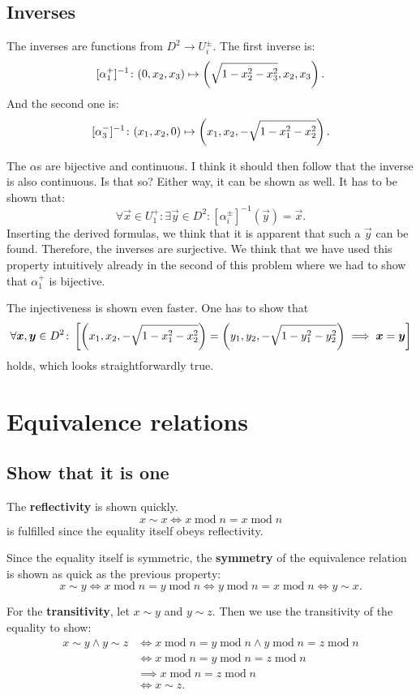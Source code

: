 \documentclass[11pt, english, fleqn, DIV=15, headinclude, BCOR=1cm]{scrartcl}
\begin{document}
\subsection{Inverses}

The inverses are functions from $D^2 \to U_i^\pm$. The first inverse is:
\[
    [\alpha_1^+]^{-1} \colon
    (0, x_2, x_3) \mapsto \left( \sqrt{1 - x_2^2 - x_3^2}, x_2, x_3 \right).
\]
And the second one is:
\[
    [\alpha_3^-]^{-1} \colon
    (x_1, x_2, 0) \mapsto \left( x_1, x_2, -\sqrt{1 - x_1^2 - x_2^2} \right).
\]

The $\alpha$s are bijective and continuous. I think it should then follow that
the inverse is also continuous. Is that so? Either way, it can be shown as
well. It has to be shown that:
\[
    \forall \vec x \in U_1^+ \colon
    \exists \vec y \in D^2 \colon
    [\alpha_i^\pm]^{-1}(\vec y) = \vec x.
\]
Inserting the derived formulas, we think that it is apparent that such a $\vec
y$ can be found. Therefore, the inverses are surjective. We think that we have
used this property intuitively already in the second of this problem where we
had to show that $\alpha_1^+$ is bijective.

The injectiveness is shown even faster. One has to show that
\[
    \forall \boldsymbol{x}, \boldsymbol{y} \in D^2 \colon
    \left[ 
        \left( x_1, x_2, -\sqrt{1 - x_1^2 - x_2^2} \right)
        =
        \left( y_1, y_2, -\sqrt{1 - y_1^2 - y_2^2} \right)
        \implies
        \boldsymbol{x} = \boldsymbol{y}
     \right]
\]
holds, which looks straightforwardly true.

\section{Equivalence relations}

\subsection{Show that it is one}

\renewcommand\mod{\operatorname{mod}}

The \textbf{reflectivity} is shown quickly.
\[
    x \sim x \iff x \mod n = x \mod n
\]
is fulfilled since the equality itself obeys reflectivity.

Since the equality itself is symmetric, the \textbf{symmetry} of the
equivalence relation is shown as quick as the previous property:
\[
    x \sim y
    \iff
    x \mod n = y \mod n
    \iff
    y \mod n = x \mod n
    \iff
    y \sim x.
\]

For the \textbf{transitivity}, let $x \sim y$ and $y \sim z$. Then we use the
transitivity of the equality to show:
\begin{align*}
    x \sim y \land y \sim z
    &\iff
    x \mod n = y \mod n
    \land
    y \mod n = z \mod n \\
    &\iff
    x \mod n = y \mod n = z \mod n \\
    &\implies
    x \mod n = z \mod n \\
    &\iff
    x \sim z.
\end{align*}
\end{document}
